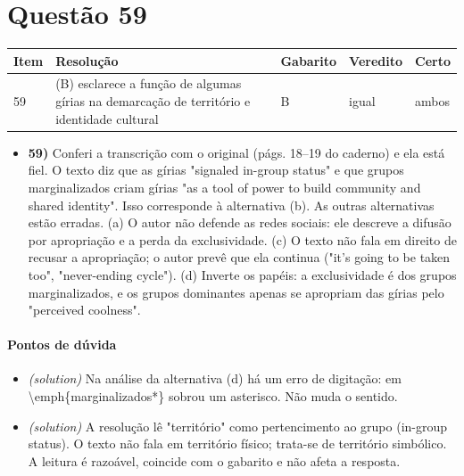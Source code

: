 \documentclass{article}%
\begin{document}
\section*{Questão 59}%
\begin{longtable}{@{}p{} p{} p{} p{} p{}@{}}\toprule Item & Resolução & Gabarito & Veredito & Certo \\ \midrule
59 & (B) esclarece a função de algumas gírias na demarcação de território e identidade cultural & B & igual & ambos \\
\bottomrule\end{longtable}%
\begin{itemize}%
\item%
\textbf{59)} Conferi a transcrição com o original (págs. 18--19 do caderno) e ela está fiel. O texto diz que as gírias "signaled in{-}group status" e que grupos marginalizados criam gírias "as a tool of power to build community and shared identity". Isso corresponde à alternativa (b). As outras alternativas estão erradas. (a) O autor não defende as redes sociais: ele descreve a difusão por apropriação e a perda da exclusividade. (c) O texto não fala em direito de recusar a apropriação; o autor prevê que ela continua ("it's going to be taken too", "never{-}ending cycle"). (d) Inverte os papéis: a exclusividade é dos grupos marginalizados, e os grupos dominantes apenas se apropriam das gírias pelo "perceived coolness".%
\end{itemize}%
\paragraph{Pontos de dúvida}%
\begin{itemize}%
\item%
\textit{(solution)} Na análise da alternativa (d) há um erro de digitação: em \textbackslash{}emph\{marginalizados*\} sobrou um asterisco. Não muda o sentido.%
\item%
\textit{(solution)} A resolução lê "território" como pertencimento ao grupo (in{-}group status). O texto não fala em território físico; trata{-}se de território simbólico. A leitura é razoável, coincide com o gabarito e não afeta a resposta.%
\end{itemize}%
\end{document}
